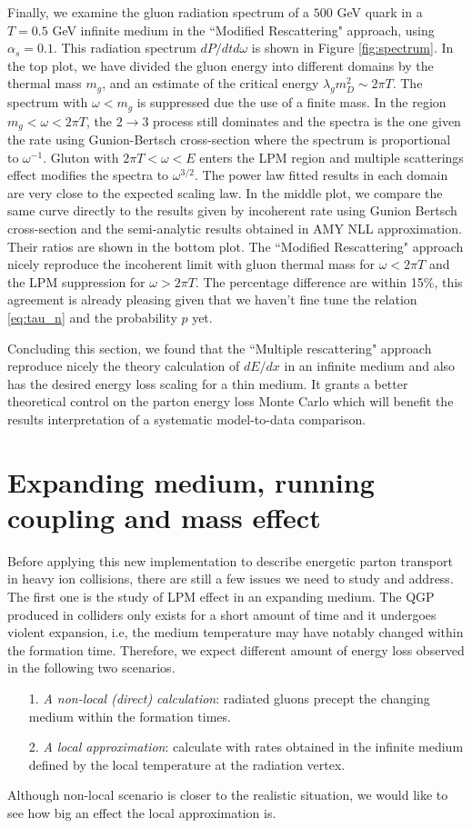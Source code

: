 \documentclass[aps, prc, reprint, amsmath, groupedaddress, nofootinbib]{revtex4-1}
\begin{document}
Finally, we examine the gluon radiation spectrum of a $500$ GeV quark in a $T = 0.5$ GeV infinite medium in the ``Modified Rescattering" approach, using $\alpha_s = 0.1$.
This radiation spectrum $dP/dtd\omega$ is shown in Figure \ref{fig:spectrum}. 
In the top plot, we have divided the gluon energy into different domains by the thermal mass $m_g$, and an estimate of the critical energy $\lambda_g m_D^2 \sim 2\pi T$.
The spectrum with $\omega < m_g$ is suppressed due the use of a finite mass.
In the region $m_g < \omega < 2\pi T$, the $2\rightarrow 3$ process still dominates and the spectra is the one given the rate using Gunion-Bertsch cross-section where the spectrum is proportional to $\omega^{-1}$.
Gluton with $2\pi T < \omega < E$ enters the LPM region and multiple scatterings effect modifies the spectra to $\omega^{3/2}$.
The power law fitted results in each domain are very close to the expected scaling law.
In the middle plot, we compare the same curve directly to the results given by incoherent rate using Gunion Bertsch cross-section and the semi-analytic results obtained in AMY NLL approximation. 
Their ratios are shown in the bottom plot.
The ``Modified Rescattering" approach nicely reproduce the incoherent limit with gluon thermal mass for $\omega < 2\pi T$ and the LPM suppression for $\omega > 2\pi T$. 
The percentage difference are within 15\%, this agreement is already pleasing given that we haven't fine tune the relation \ref{eq:tau_n} and the probability $p$ yet.

Concluding this section, we found that the ``Multiple rescattering" approach reproduce nicely the theory calculation of $dE/dx$ in an infinite medium and also has the desired energy loss scaling for a thin medium.
It grants a better theoretical control on the parton energy loss Monte Carlo which will benefit the results interpretation of a systematic model-to-data comparison.

\section{Expanding medium, running coupling and mass effect}\label{section:disscuss}
Before applying this new implementation to describe energetic parton transport in heavy ion collisions, there are still a few issues we need to study and address.
The first one is the study of LPM effect in an expanding medium. 
The QGP produced in colliders only exists for a short amount of time and it undergoes violent expansion, i.e, the medium temperature may have notably changed within the formation time.
Therefore, we expect different amount of energy loss observed in the following two scenarios.
\begin{itemize}
\item[1.]  {\it A non-local (direct) calculation}: radiated gluons precept the changing medium within the formation times.
\item[2.] {\it A local approximation}: calculate with rates obtained in the infinite medium defined by the local temperature at the radiation vertex.
\end{itemize} 
Although non-local scenario is closer to the realistic situation, we would like to see how big an effect the local approximation is.
\end{document}
